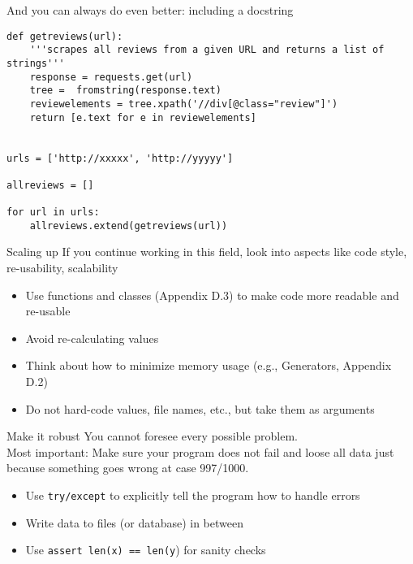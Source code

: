 \documentclass{beamer}
\begin{document}
\begin{frame}
And you can always do even better: including a docstring
\begin{lstlisting}
def getreviews(url):
    '''scrapes all reviews from a given URL and returns a list of strings'''
    response = requests.get(url)
    tree =  fromstring(response.text)
    reviewelements = tree.xpath('//div[@class="review"]')
    return [e.text for e in reviewelements]


urls = ['http://xxxxx', 'http://yyyyy']

allreviews = []

for url in urls:
    allreviews.extend(getreviews(url))
\end{lstlisting}
\end{frame}



\begin{frame}{Scaling up}
	If you continue working in this field, look into aspects like code style, re-usability, scalability
	\begin{itemize}
		\item Use functions and classes (Appendix D.3) to make code more readable and re-usable
		\item Avoid re-calculating values
		\item Think about how to minimize memory usage (e.g., Generators, Appendix D.2)
		\item Do not hard-code values, file names, etc., but take them as arguments
	\end{itemize}	
\end{frame}




\begin{frame}{Make it robust}
You cannot foresee every possible problem.\\
Most important: Make sure your program does not fail and loose all data just because something goes wrong at case 997/1000.
	\begin{itemize}
		\item Use \texttt{try/except} to explicitly tell the program how to handle errors
		\item Write data to files (or database) in between
		\item Use \texttt{assert len(x) == len(y}) for sanity checks
	\end{itemize}	
\end{frame}


%
%
\end{document}
